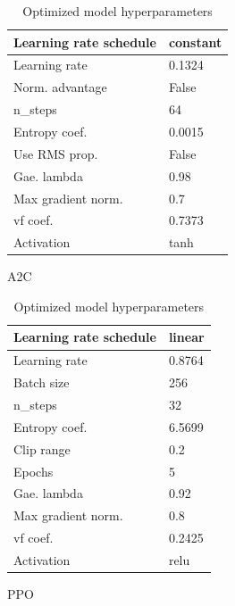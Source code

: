 \documentclass{article}
\begin{document}
\begin{table}[H]
	\begin{subtable}[h]{0.45\textwidth}
		\centering
		\begin{tabular}{|l | l|}
		\hline
		Learning rate schedule & constant  \\
		\hline
		Learning rate & 0.1324  \\
		\hline
		Norm. advantage & False  \\
		\hline
		n\_steps & 64  \\
		\hline
		Entropy coef. & 0.0015 \\
		\hline
		Use RMS prop. & False  \\
		\hline
		Gae. lambda & 0.98 \\
		\hline
		Max gradient norm. & 0.7  \\
		\hline
		vf coef. & 0.7373  \\
		\hline
		Activation  & tanh  \\
		\hline
		\end{tabular}
		\caption{A2C}
		\label{tab:a2c}
	\end{subtable}
	\hfill
	\begin{subtable}[h]{0.45\textwidth}
		\centering
		\begin{tabular}{|l | l |}
		\hline
		Learning rate schedule & linear \\
		\hline 
		Learning rate & 0.8764  \\
		\hline
		Batch size & 256  \\
		\hline
		n\_steps & 32  \\
		\hline
		Entropy coef. & 6.5699 \\
		\hline
		Clip range & 0.2  \\
		\hline
		Epochs & 5 \\
		\hline
		Gae. lambda & 0.92 \\
		\hline
		Max gradient norm. &  0.8 \\
		\hline
		vf coef. & 0.2425  \\
		\hline
		Activation & relu \\
		\hline
		\end{tabular}
		\caption{PPO}
		\label{tab:ppo}
	\end{subtable}
	\caption{Optimized model hyperparameters}
	\label{tab:hyp}
\end{table}
\end{document}
